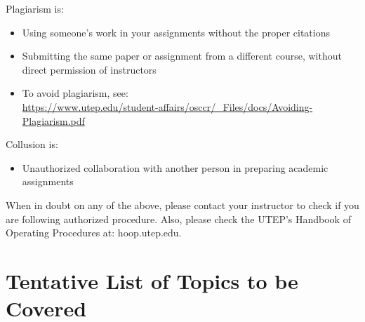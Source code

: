 \documentclass[12pt]{scrartcl}
\begin{document}
Plagiarism is:
\begin{itemize}
\item Using someone’s work in your assignments without the proper citations
\item Submitting the same paper or assignment from a different course, without direct permission of instructors
\item[]\vspace{1em} To avoid plagiarism, see: \\{\footnotesize\url{https://www.utep.edu/student-affairs/osccr/_Files/docs/Avoiding-Plagiarism.pdf}}
\end{itemize}
                               
Collusion is:
\begin{itemize}
\item Unauthorized collaboration with another person in preparing academic assignments
\end{itemize}

\begin{tcolorbox}[colback=red!5,colframe=red!75!black,title=Important!]
When in doubt on any of the above, please contact your instructor to check if you are following authorized procedure. Also, please check the UTEP’s Handbook of Operating Procedures at: hoop.utep.edu. 
\end{tcolorbox}

\section{Tentative List of Topics to be Covered}
\end{document}
